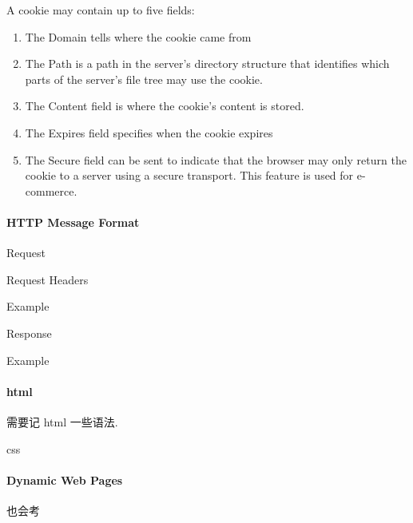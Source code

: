 A cookie may contain up to five fields:
\begin{enumerate}
    \item The Domain tells where the cookie came from
    \item The Path is a path in the server’s directory structure that identifies
    which parts of the server’s file tree may use the cookie.
    \item The Content field is where the cookie’s content is stored.
    \item The Expires field specifies when the cookie expires
    \item The Secure field can be sent to indicate that the browser may only
    return the cookie to a server using a secure transport. This feature
    is used for e-commerce.
\end{enumerate}


\paragraph{HTTP Message Format}\quad %

Request

Request Headers

Example

Response

Example

\paragraph{html}需要记 html 一些语法. %

css


\paragraph{Dynamic Web Pages}也会考